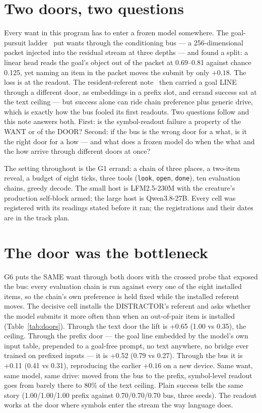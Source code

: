 \documentclass[11pt]{article}
\begin{document}
\section{Two doors, two questions}

Every want in this program has to enter a frozen model somewhere.
The goal-pursuit ladder~\cite{penov2026hostblock,penov2026act} put
wants through the conditioning bus --- a 256-dimensional packet
injected into the residual stream at three depths --- and found a
split: a linear head reads the goal's object out of the packet at
0.69--0.81 against chance 0.125, yet naming an item in the packet
moves the submit by only $+0.18$. The loss is at the readout. The
resident-referent note~\cite{penov2026inside} then carried a goal
LINE through a different door, as embeddings in a prefix slot, and
errand success sat at the text ceiling --- but success alone can ride
chain preference plus generic drive, which is exactly how the bus
fooled its first readouts. Two questions follow and this note answers
both. First: is the symbol-readout failure a property of the WANT or
of the DOOR? Second: if the bus is the wrong door for a what, is it the
right door for a how --- and what does a frozen model do when the what
and the how arrive through different doors at once?

The setting throughout is the G1 errand: a chain of three places, a
two-item reveal, a budget of eight ticks, three tools (\texttt{look},
\texttt{open}, \texttt{done}), ten evaluation chains, greedy decode.
The small host is LFM2.5-230M with the creature's production
self-block armed; the large host is Qwen3.8-27B. Every cell was
registered with its readings stated before it ran; the registrations
and their dates are in the track plan.

\section{The door was the bottleneck}

G6 puts the SAME want through both doors with the crossed probe that
exposed the bus: every evaluation chain is run against every one of
the eight installed items, so the chain's own preference is held fixed
while the installed referent moves. The decisive cell installs the
DISTRACTOR's referent and asks whether the model submits it more often
than when an out-of-pair item is installed (Table~\ref{tab:doors}).
Through the text door the lift is +0.65
(1.00 vs 0.35), the ceiling.
Through the prefix door --- the goal line embedded by the model's own
input table, prepended to a goal-free prompt, no text anywhere, no
bridge ever trained on prefixed inputs --- it is +0.52
(0.79 vs 0.27). Through
the bus it is +0.11 (0.41 vs
0.31), reproducing the earlier $+0.16$ on a new
device. Same want, same model, same drive: moved from the bus to the
prefix, symbol-level readout goes from barely there to
80\% of the text ceiling. Plain
success tells the same story (1.00/1.00/1.00
prefix against 0.70/0.70/0.70 bus, three seeds).
The readout works at the door where symbols enter the stream the way
language does.
\end{document}
